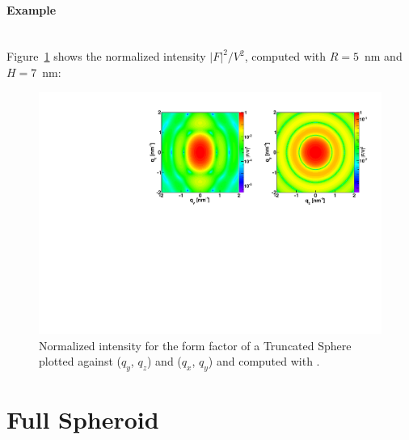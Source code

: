 \paragraph{Example}\mbox{}\\
Figure~\ref{fig:SphereEx} shows the normalized intensity $|F|^2/V^2$, computed with $R=5$~nm and $H=7$~nm:
\begin{figure}[ht]
\begin{center}
\includegraphics[angle=-90,width=\textwidth]{Figures/ff/figffsphere.pdf}
\end{center}
\caption{Normalized intensity for the form factor of a Truncated Sphere plotted against ($q_y$, $q_z$) and ($q_x$, $q_y$) and
  computed with .}
\label{fig:SphereEx}
\end{figure}



\newpage
\section{Full Spheroid} 

